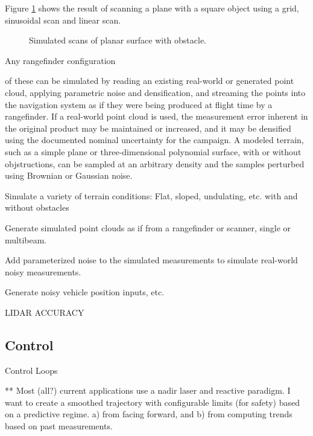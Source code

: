 \documentclass[10pt,a4paper]{report}
\begin{document}
Figure \ref{fig:plane_object} shows the result of scanning a plane with a square object using a grid, sinusoidal scan and linear scan.

\begin{figure}
\centering
\def\svgscale{0.25}

\def\svgscale{0.25}

\def\svgscale{0.25}

\caption{Simulated scans of planar surface with obstacle.}
\label{fig:plane_object}
\end{figure}


Any rangefinder configuration

of these can be simulated by reading an existing real-world or generated point cloud, applying parametric noise and densification, and streaming the points into the navigation system as if they were being produced at flight time by a rangefinder. If a real-world point cloud is used, the measurement error inherent in the original product may be maintained or increased, and it may be densified using the documented nominal uncertainty for the campaign. A modeled terrain, such as a simple plane or three-dimensional polynomial surface, with or without objstructions, can be sampled at an arbitrary density and the samples perturbed using Brownian or Gaussian noise.

Simulate a variety of terrain conditions: Flat, sloped, undulating, etc. with and without obstacles

Generate simulated point clouds as if from a rangefinder or scanner, single or multibeam.

Add parameterized noise to the simulated measurements to simulate real-world noisy measurements.

Generate noisy vehicle position inputs, etc.

LIDAR ACCURACY \cite{May2007}




\subsection{Control}

Control Loops








** Most (all?) current applications use a nadir laser and reactive paradigm. I want to create a smoothed trajectory with configurable limits (for safety) based on a predictive regime. a) from facing forward, and b) from computing trends based on past measurements.
\end{document}
